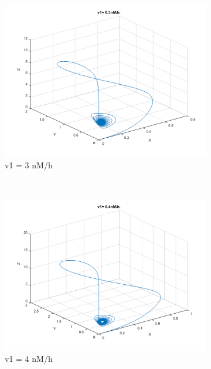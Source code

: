\documentclass[10pt,a4paper,oneside,twocolumn]{article}
\numberwithin{equation}{section} %
\begin{document}
\begin{figure}
	\begin{subfigure}[b]{0.3\textwidth}
	    \includegraphics[width=\textwidth]{LotsofthesameA/A-AA3.png}
	    \caption{v1 = 3 nM/h}
	\end{subfigure}
	~ 
	\begin{subfigure}[b]{0.3\textwidth}
	    \includegraphics[width=\textwidth]{LotsofthesameA/A-AA4.png}
	    \caption{v1 = 4 nM/h}
	\end{subfigure}
	~
	\begin{subfigure}[b]{0.3\textwidth}

\end{subfigure}
\end{figure}
\end{document}
